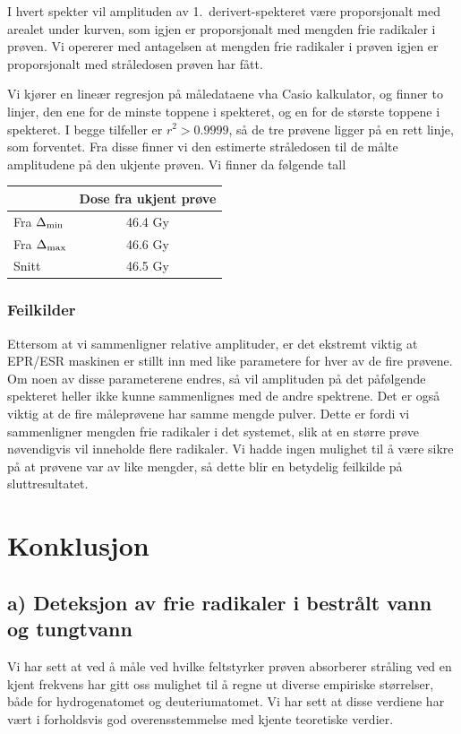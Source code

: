 \documentclass[a4paper, 11pt, notitlepage]{article}
\begin{document}
\clearpage


I hvert spekter vil amplituden av 1.\ derivert-spekteret være proporsjonalt med arealet under kurven, som igjen er proporsjonalt med mengden frie radikaler i prøven. Vi opererer med antagelsen at mengden frie radikaler i prøven igjen er proporsjonalt med stråledosen prøven har fått.

Vi kjører en lineær regresjon på måledataene vha Casio kalkulator, og finner to linjer, den ene for de minste toppene i spekteret, og en for de største toppene i spekteret. I begge tilfeller er $r^2 > 0.9999$, så de tre prøvene ligger på en rett linje, som forventet. Fra disse finner vi den estimerte stråledosen til de målte amplitudene på den ukjente prøven. Vi finner da følgende tall
\begin{center}
 \begin{tabular}{l|c}
             & Dose fra ukjent prøve \\ \hline
 Fra $\Delta_{\rm min}$ & 46.4 Gy \\ \hline 
 Fra $\Delta_{\rm max}$ & 46.6 Gy\\ \hline
 Snitt & 46.5 Gy
 \end{tabular}
\end{center}

\subsubsection{Feilkilder}
Ettersom at vi sammenligner relative amplituder, er det ekstremt viktig at EPR/ESR maskinen er stillt inn med like parametere for hver av de fire prøvene. Om noen av disse parameterene endres, så vil amplituden på det påfølgende spekteret heller ikke kunne sammenlignes med de andre spektrene. Det er også viktig at de fire måleprøvene har samme mengde pulver. Dette er fordi vi sammenligner mengden frie radikaler i det systemet, slik at en større prøve nøvendigvis vil inneholde flere radikaler. Vi hadde ingen mulighet til å være sikre på at prøvene var av like mengder, så dette blir en betydelig feilkilde på sluttresultatet.


\section{Konklusjon}
\subsection{a) Deteksjon av frie radikaler i bestrålt vann og tungtvann}
Vi har sett at ved å måle ved hvilke feltstyrker prøven absorberer stråling ved en kjent frekvens har gitt oss mulighet til å regne ut diverse empiriske størrelser, både for hydrogenatomet og deuteriumatomet. Vi har sett at disse verdiene har vært i forholdsvis god overensstemmelse med kjente teoretiske verdier.
\end{document}
